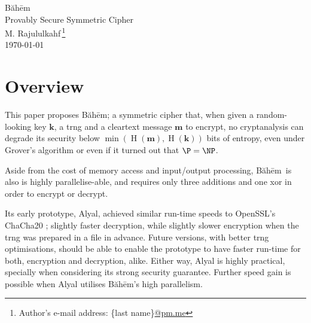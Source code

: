 \documentclass[twocolumn,hidelinks]{article}
\newcommand{\baheem}{Băhēm}
\DeclareMathOperator{\entropy}{H}
\begin{document}
\begin{center}
    \Huge
    \baheem\\
    \Large
    Provably Secure Symmetric Cipher\\
    \normalsize
    \vspace{0.5em}
    M. Rajululkahf\,\footnote{Author's e-mail address: \{last
    name\}\url{@pm.me}}\\
    \vspace{0.5em}
    \footnotesize
    \today\\
\end{center}

\section*{Overview}
This paper proposes \baheem;  a symmetric cipher that, when given a
random-looking key $\mathbf{k}$, a \gls{trng} and a cleartext message
$\mathbf{m}$ to encrypt, no cryptanalysis can degrade its security below
$\min(\entropy(\mathbf{m}), \entropy(\mathbf{k}))$ bits of entropy, even
under Grover's algorithm \cite{10.1145/237814.237866} or even if it turned
out that $\P = \NP$.

Aside from the cost of memory access and input/output processing, \baheem\
is also is highly parallelise-able, and requires only three additions and
one \gls{xor} in order to encrypt or decrypt.

Its early prototype, Alyal, achieved similar run-time speeds to OpenSSL's
ChaCha20 \cite{chacha20}; slightly faster decryption, while slightly slower
encryption when the \gls{trng} was prepared in a file in advance.  Future
versions, with better \gls{trng} optimisations, should be able to enable
the prototype to have faster run-time for both, encryption and decryption,
alike.  Either way, Alyal is highly practical, specially when considering
its strong security guarantee.  Further speed gain is possible when Alyal
utilises \baheem's high parallelism.
\end{document}
